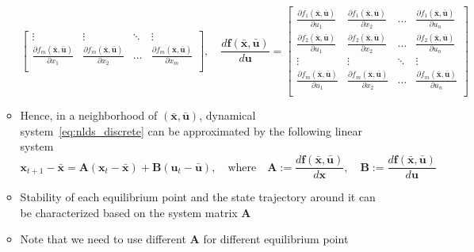 \documentclass[12pt,a4paper]{article}
\begin{document}
\begin{itemize}
\begin{itemize}
\begin{equation}
\begin{bmatrix}
        \vdots & \vdots  & \ddots & \vdots \\
        \frac{\partial f_{m}(\bar{\bm{x}},\bar{\bm{u}})}{\partial x_{1}} & \frac{\partial f_{m}(\bar{\bm{x}},\bar{\bm{u}})}{\partial x_{2}}  & \ldots & \frac{\partial f_{m}(\bar{\bm{x}},\bar{\bm{u}})}{\partial x_{m}} \\
      \end{bmatrix},
      \quad
      \frac{d\bm{f}(\bar{\bm{x}},\bar{\bm{u}})}{d\bm{u}}
      =
      \begin{bmatrix}
        \frac{\partial f_{1}(\bar{\bm{x}},\bar{\bm{u}})}{\partial u_{1}} & \frac{\partial f_{1}(\bar{\bm{x}},\bar{\bm{u}})}{\partial x_{2}}  & \ldots & \frac{\partial f_{1}(\bar{\bm{x}},\bar{\bm{u}})}{\partial u_{n}} \\
        \frac{\partial f_{2}(\bar{\bm{x}},\bar{\bm{u}})}{\partial u_{1}} & \frac{\partial f_{2}(\bar{\bm{x}},\bar{\bm{u}})}{\partial x_{2}}  & \ldots & \frac{\partial f_{2}(\bar{\bm{x}},\bar{\bm{u}})}{\partial u_{n}} \\
        \vdots & \vdots  & \ddots & \vdots \\
        \frac{\partial f_{m}(\bar{\bm{x}},\bar{\bm{u}})}{\partial u_{1}} & \frac{\partial f_{m}(\bar{\bm{x}},\bar{\bm{u}})}{\partial x_{2}}  & \ldots & \frac{\partial f_{m}(\bar{\bm{x}},\bar{\bm{u}})}{\partial u_{n}} \\
      \end{bmatrix}
    \end{equation}
  \item Hence, in a neighborhood of $(\bar{\bm{x}},\bar{\bm{u}})$,
    dynamical system~\eqref{eq:nlds_discrete} can be approximated by the following linear system
    \begin{equation}\nonumber%
      \bm{x}_{t+1} - \bar{\bm{x}}
      =
      \bm{A}(\bm{x}_{t}-\bar{\bm{x}})
      +
      \bm{B}(\bm{u}_{t}-\bar{\bm{u}}),
      \quad\text{where}\quad
      \bm{A} := \frac{d\bm{f}(\bar{\bm{x}},\bar{\bm{u}})}{d\bm{x}},
      \quad
      \bm{B} := \frac{d\bm{f}(\bar{\bm{x}},\bar{\bm{u}})}{d\bm{u}}
    \end{equation}
  \item Stability of each equilibrium point
    and the state trajectory around it can be characterized
    based on the system matrix $\bm{A}$
  \item Note that we need to use different $\bm{A}$ for different equilibrium point
  \end{itemize}


\end{itemize}
\end{document}
